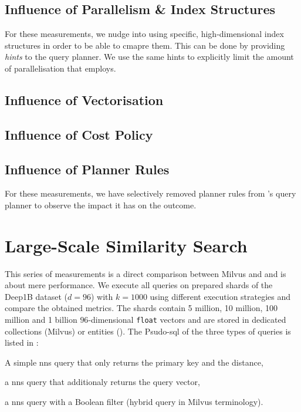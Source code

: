 \subsection{Influence of Parallelism \& Index Structures}

For these measurements, we nudge \cottontail{} into using specific, high-dimensional index structures in order to be able to cmapre them. This can be done by providing \emph{hints} to the query planner. We use the same hints to explicitly limit the amount of parallelisation that \cottontail{} employs.

\subsection{Influence of Vectorisation}

\subsection{Influence of Cost Policy}

\subsection{Influence of Planner Rules}

For these measurements, we have selectively removed planner rules from \cottontail's query planner to observe the impact it has on the outcome.


\section{Large-Scale Similarity Search}
This series of measurements is a direct comparison between Milvus and \cottontail{} and is about mere performance. We execute all queries on prepared shards of the Deep1B \cite{Babenko:2016Efficient} dataset ($d=96$) with $k=1000$ using different execution strategies and compare the obtained metrics. The shards contain 5 million, 10 million, 100 million and 1 billion $96$-dimensional \texttt{float} vectors and are stored in dedicated collections (Milvus) or entities (\cottontail). The Psudo-\acrshort{sql} of the three types of queries is listed in :
\begin{enumerate*}[label=(\roman*)]
    \item A simple \acrshort{nns} query that only returns the primary key and the distance,
    \item a \acrshort{nns} query that additionaly returns the query vector,
    \item a \acrshort{nns} query with a Boolean filter (hybrid query in Milvus terminology).
\end{enumerate*}

